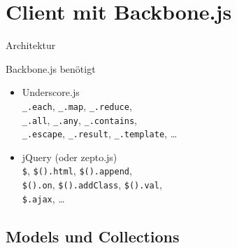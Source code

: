 \section[Client]{Client mit Backbone.js}

\begin{frame}{Architektur}
  \begin{center}
    
  \end{center}
\end{frame}

\begin{frame}{Backbone.js benötigt}
  \begin{itemize}
    \item Underscore.js \\
      \lstinline-_.each-, \lstinline-_.map-,
      \lstinline-_.reduce-, \\
      \lstinline-_.all-, \lstinline-_.any-, \lstinline-_.contains-, \\
      \lstinline-_.escape-, \lstinline-_.result-, \lstinline-_.template-,
      \ldots \\[5ex]
    \item jQuery (oder zepto.js) \\
      \lstinline-$-, \lstinline-$().html-,
      \lstinline-$().append-, \\
      \lstinline-$().on-, \lstinline-$().addClass-, \lstinline-$().val-, \\
      \lstinline-$.ajax-, \ldots
  \end{itemize}
\end{frame}

\subsection{Models und Collections}

